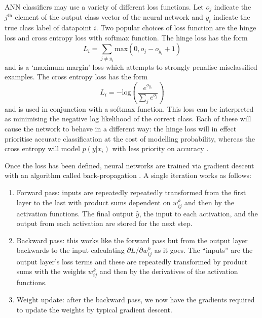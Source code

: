 ANN classifiers may use a variety of different loss functions. 
Let $o_{j}$ indicate the $j^{\mathrm{th}}$ element of the output class vector of the neural network and $y_{i}$ indicate the true class label of datapoint $i$. 
Two popular choices of loss function \cite{CS231n} are the hinge loss and cross entropy loss with softmax function.
The hinge loss has the form
\begin{equation}
    L_{i} = \sum_{j\neq{}y_{i}}\mathrm{max}(0,o_{j}-o_{y_{i}} + 1)
\end{equation}
and is a `maximum margin' loss which attempts to strongly penalise misclassified examples. 
The cross entropy loss has the form
\begin{equation}
    L_{i} = -\mathrm{log}\left(
        \frac{e^{o_{y_{i}}}}
        {\sum_{j}e^{o_{j}}}\right)
\end{equation}
and is used in conjunction with a softmax function. This loss can be interpreted as minimising the negative log likelihood of the correct class.
Each of these will cause the network to behave in a different way: the hinge loss will in effect prioritise accurate classification at the cost of modelling probability, whereas the cross entropy will model $p(y|x_{i})$ with less priority on accuracy \cite{CS231n}.

Once the loss has been defined, neural networks are trained via gradient descent with an algorithm called back-propagation \cite{Backprop}. A single iteration works as follows:
\begin{enumerate}[leftmargin=.5in,noitemsep]
    \item Forward pass: inputs are repeatedly repeatedly transformed from the first layer to the last with product sums dependent on $w_{ij}^{k}$ and then by the activation functions. The final output $\hat{y}$, the input to each activation, and the output from each activation are stored for the next step. 
    \item Backward pass: this works like the forward pass but from the output layer backwards to the input calculating $\partial{L}/\partial{w_{ij}^{k}}$ as it goes. The ``inputs'' are the output layer's loss terms and these are repeatedly transformed by product sums with the weights $w_{ij}^{k}$ and then by the derivatives of the activation functions.  
    \item Weight update: after the backward pass, we now have the gradients required to update the weights by typical gradient descent.
\end{enumerate}


